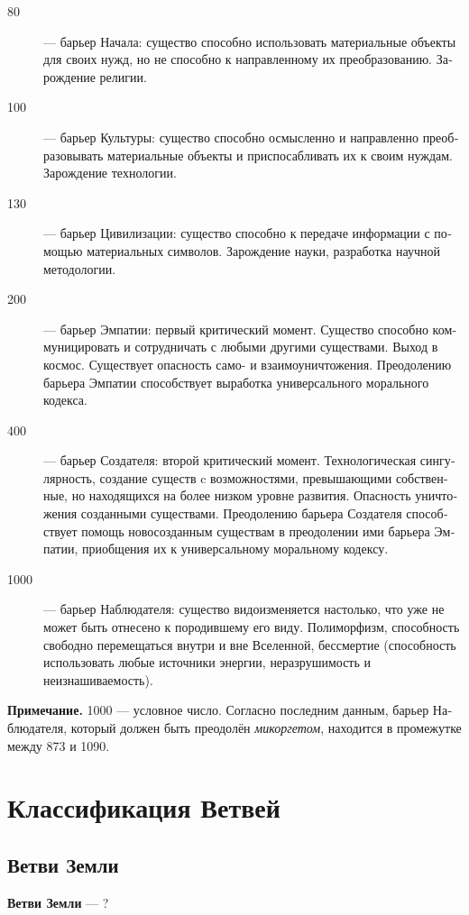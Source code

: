 \documentclass[a4paper,12pt,fleqn]{book}\usepackage{cooltooltips}\usepackage{polyglossia}\setdefaultlanguage[babelshorthands=true]{russian}\setotherlanguage{english}\defaultfontfeatures{Ligatures=TeX,Mapping=tex-text} \usepackage{xcolor}\definecolor{lightgray}{HTML}{bbbbbb}\color{lightgray}\newcommand{\ml}[3]{\textenglish{\textcolor{black}{#3}}}
\newcommand{\theterm}[3]{\textbf{\hypertarget{#1}{#2}} --- #3}
\begin{document}
\begin{description}
\item [80] --- барьер Начала: существо способно использовать материальные объекты для своих нужд, но не способно к направленному их преобразованию.
Зарождение религии.
\item[100] --- барьер Культуры: существо способно осмысленно и направленно преобразовывать материальные объекты и приспосабливать их к своим нуждам.
Зарождение технологии.
\item[130] --- барьер Цивилизации: существо способно к передаче информации с помощью материальных символов.
Зарождение науки, разработка научной методологии.
\item[200] --- барьер Эмпатии: первый критический момент.
Существо способно коммуницировать и сотрудничать с любыми другими существами.
Выход в космос.
Существует опасность само- и взаимоуничтожения.
Преодолению барьера Эмпатии способствует выработка универсального морального кодекса.
\item[400] --- барьер Создателя: второй критический момент.
Технологическая сингулярность, создание существ c возможностями, превышающими собственные, но находящихся на более низком уровне развития.
Опасность уничтожения созданными существами.
Преодолению барьера Создателя способствует помощь новосозданным существам в преодолении ими барьера Эмпатии, приобщения их к универсальному моральному кодексу.
\item[1000] --- барьер Наблюдателя: существо видоизменяется настолько, что уже не может быть отнесено к породившему его виду.
Полиморфизм, способность свободно перемещаться внутри и вне Вселенной, бессмертие (способность использовать любые источники энергии, неразрушимость и неизнашиваемость).
\end{description}

\textbf{Примечание.}
1000 --- условное число.
Согласно последним данным, барьер Наблюдателя, который должен быть преодолён \textit{микоргетом}, находится в промежутке между 873 и 1090.

\chapter{Классификация Ветвей}

\section{Ветви Земли}

\theterm{earth-forks} %
{Ветви Земли}
{?}
\end{document}
